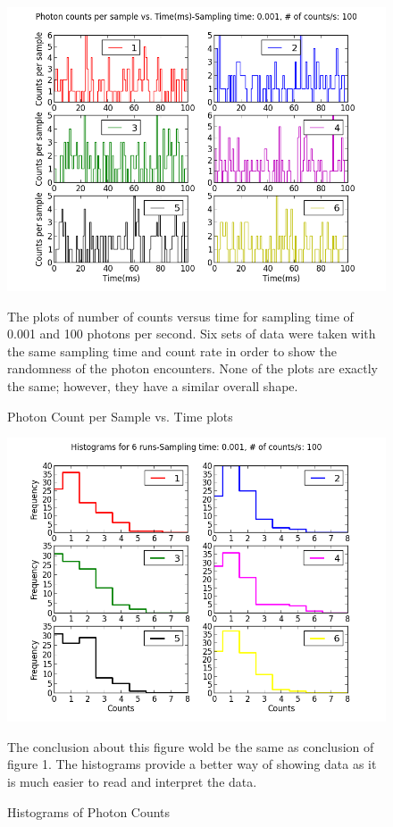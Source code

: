\documentclass[letterpaper,12pt]{article}
\begin{document}
\begin{figure}
\centering
\includegraphics[scale=0.7]{ex_1_plot_1.png}
\caption{ Photon Count per Sample vs. Time plots}
The plots of number of counts versus time for sampling time of 0.001 and 100 photons per second. Six sets of data were taken with the same sampling time and count rate in order to show the randomness of the photon encounters. None of the plots are exactly the same; however, they have a similar overall shape.
\end{figure}


\begin{figure}
\centering
\includegraphics[scale=0.7]{histograms.png}
\caption{Histograms of Photon Counts}
The conclusion about this figure wold be the same as conclusion of figure 1.  The histograms provide a better way of showing data as it is much easier to read and interpret the data.
\end{figure}
\end{document}
